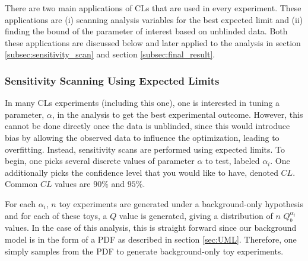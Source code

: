 There are two main applications of CLs that are used in every experiment. These applications are (i) scanning analysis variables for the best expected limit and (ii) finding the bound of the parameter of interest based on unblinded data. Both these applications are discussed below and later applied to the analysis in section \ref{subsec:sensitivity_scan} and section \ref{subsec:final_result}.

\subsubsection{Sensitivity Scanning Using Expected Limits}
\label{subsubsec:sensitivity_scanning_limits}

In many CLs experiments (including this one), one is interested in tuning a parameter, $\alpha$, in the analysis to get the best experimental outcome. However, this cannot be done directly once the data is unblinded, since this would introduce bias by allowing the observed data to influence the optimization, leading to overfitting. Instead, sensitivity scans are performed using expected limits. To begin, one picks several discrete values of parameter $\alpha$ to test, labeled $\alpha_i$. One additionally picks the confidence level that you would like to have, denoted $CL$. Common $CL$ values are $90\%$ and $95\%$. 

For each $\alpha_i$, $n$ toy experiments are generated under a background-only hypothesis and for each of these toys, a $Q$ value is generated, giving a distribution of $n$ $Q^{\alpha_i}_b$ values. In the case of this analysis, this is straight forward since our background model is in the form of a PDF as described in section \ref{sec:UML}. Therefore, one simply samples from the PDF to generate background-only toy experiments. 

